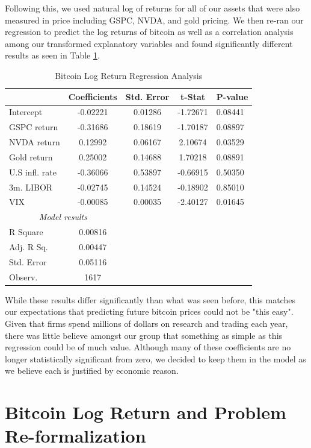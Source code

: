 \documentclass[9pt,twocolumn,twoside]{ilcss}
\begin{document}
Following this, we used natural log of returns for all of our assets that were also measured in price including GSPC, NVDA, and gold pricing. We then re-ran our regression to predict the log returns of bitcoin as well as a correlation analysis among our transformed explanatory variables and found significantly different results as seen in Table \ref{BTC_log_return_reg_analysis}. 

\begin{table}[h]
\centering
\caption{Bitcoin Log Return Regression Analysis}
\label{BTC_log_return_reg_analysis}
\begin{tabular}{lcccl} 
\hline
\hline
& Coefficients & Std. Error & t-Stat & P-value\\
\hline
Intercept & -0.02221 & 0.01286 & -1.72671 & 0.08441\\
GSPC return & -0.31686 & 0.18619 & -1.70187 & 0.08897\\
NVDA return & 0.12992 & 0.06167 & 2.10674 & 0.03529\\
Gold return & 0.25002 & 0.14688 & 1.70218 & 0.08891\\
U.S infl. rate & -0.36066 & 0.53897 & -0.66915 & 0.50350\\
3m. LIBOR & -0.02745 & 0.14524 & -0.18902 & 0.85010\\
VIX & -0.00085 & 0.00035 & -2.40127 & 0.01645  \\
\hline
\multicolumn{2}{c}{\textit{Model results}}\\
\cline{1-2}
R Square & 0.00816 \\
Adj. R Sq. & 0.00447 \\
Std. Error & 0.05116 \\
Observ. & 1617 \\
\hline
\end{tabular}
\end{table}

While these results differ significantly than what was seen before, this matches our expectations that predicting future bitcoin prices could not be "this easy". Given that firms spend millions of dollars on research and trading each year, there was little believe amongst our group that something as simple as this regression could be of much value. Although many of these coefficients are no longer statistically significant from zero, we decided to keep them in the model as we believe each is justified by economic reason.

\section{Bitcoin Log Return and Problem Re-formalization}
\end{document}
